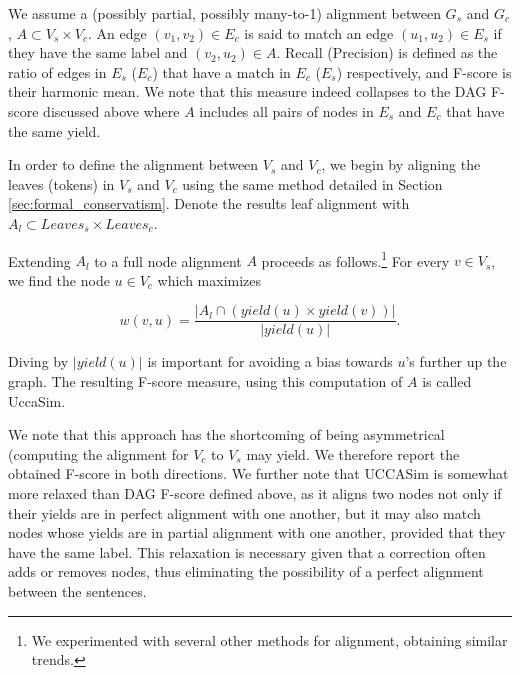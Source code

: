 \documentclass[letter,11pt]{article}
\begin{document}
We assume a (possibly partial, possibly many-to-1) alignment between $G_s$ and $G_c$,
$A \subset V_s \times V_c$. An edge $(v_1,v_2) \in E_c$ is said to match an edge
$(u_1,u_2) \in E_s$ if they have the same label and $(v_2,u_2) \in A$. Recall (Precision)
is defined as the ratio of edges in $E_s$ ($E_c$) that have a match in $E_c$ ($E_s$) respectively, and
F-score is their harmonic mean. We note that this measure indeed collapses to the
DAG F-score discussed above where $A$ includes all pairs of nodes in $E_s$ and $E_c$ that have
the same yield.

In order to define the alignment between $V_s$ and $V_c$, we begin by aligning the leaves
(tokens) in $V_s$ and $V_c$ using the same method detailed in Section \ref{sec:formal_conservatism}.
Denote the results leaf alignment with $A_l \subset Leaves_s \times Leaves_c$.

Extending $A_l$ to a full node alignment $A$ proceeds as follows.\footnote{We experimented
  with several other methods for alignment, obtaining similar trends.}
For every $v \in V_s$, we find the node $u \in V_c$ which maximizes

\begin{equation*}
    w(v,u) = \frac{\vert A_l \cap (yield(u) \times yield(v))\vert}{\vert yield(u) \vert}.
\end{equation*}

Diving by $|yield(u)|$ is important for avoiding a bias towards $u$'s further up the graph.
The resulting F-score measure, using this computation of $A$ is called {\sc UccaSim}.

We note that this approach has the shortcoming of being asymmetrical (computing the alignment
for $V_c$ to $V_s$ may yield. We therefore report the obtained F-score in both directions.
We further note that {\sc UCCASim} is somewhat more relaxed than DAG F-score defined above,
as it aligns two nodes not only if their yields are in perfect alignment with
one another, but it may also match nodes whose yields are in partial alignment
with one another, provided that they have the same label.
This relaxation is necessary given that a correction often adds
or removes nodes, thus eliminating the possibility of a perfect alignment between
the sentences. 

\end{document}
